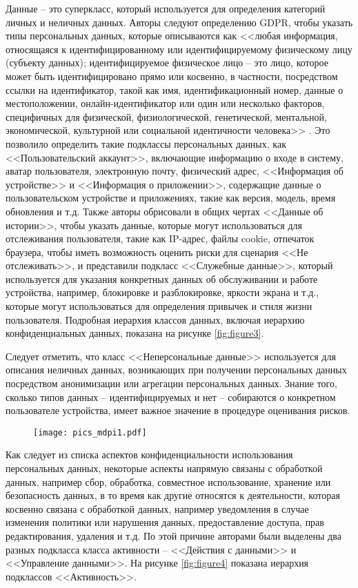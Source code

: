 \documentclass[../main]{subfiles}
\begin{document}
Данные -- это суперкласс, который используется для определения категорий личных и неличных данных. Авторы следуют определению GDPR, чтобы указать типы персональных данных, которые описываются как <<любая информация, относящаяся к идентифицированному или идентифицируемому физическому лицу (субъекту данных); идентифицируемое физическое лицо -- это лицо, которое может быть идентифицировано прямо или косвенно, в частности, посредством ссылки на идентификатор, такой как имя, идентификационный номер, данные о местоположении, онлайн-идентификатор или один или несколько факторов, специфичных для физической, физиологической, генетической, ментальной, экономической, культурной или социальной идентичности человека>> \cite{GDPR, MDPI4}. Это позволило определить такие подклассы персональных данных, как <<Пользовательский аккаунт>>, включающие информацию о входе в систему, аватар пользователя, электронную почту, физический адрес, <<Информация об устройстве>> и <<Информация о приложении>>, содержащие данные о пользовательском устройстве и приложениях, такие как версия, модель, время обновления и т.д. Также авторы обрисовали в общих чертах <<Данные об истории>>, чтобы указать данные, которые могут использоваться для отслеживания пользователя, такие как IP-адрес, файлы cookie, отпечаток браузера, чтобы иметь возможность оценить риски для сценария <<Не отслеживать>>, и представили подкласс <<Служебные данные>>, который используется для указания конкретных данных об обслуживании и работе устройства, например, блокировке и разблокировке, яркости экрана и т.д., которые могут использоваться для определения привычек и стиля жизни пользователя. Подробная иерархия классов данных, включая иерархию конфиденциальных данных, показана на рисунке \ref{fig:figure3}.

Следует отметить, что класс <<Неперсональные данные>> используется для описания неличных данных, возникающих при получении персональных данных посредством анонимизации или агрегации персональных данных. Знание того, сколько типов данных -- идентифицируемых и нет -- собираются о конкретном пользователе устройства, имеет важное значение в процедуре оценивания рисков.

\begin{figure}[H]
    \centering
    {\texttt{[image: pics\_mdpi1.pdf]}}
    \vspace{-\baselineskip}
\end{figure}

Как следует из списка аспектов конфиденциальности использования персональных данных, некоторые аспекты напрямую связаны с обработкой данных, например сбор, обработка, совместное использование, хранение или безопасность данных, в то время как другие относятся к деятельности, которая косвенно связана с обработкой данных, например уведомления в случае изменения политики или нарушения данных, предоставление доступа, прав редактирования, удаления и т.д. По этой причине авторами были выделены два разных подкласса класса активности -- <<Действия с данными>> и <<Управление данными>>. На рисунке \ref{fig:figure4} показана иерархия подклассов <<Активность>>. 
\end{document}
